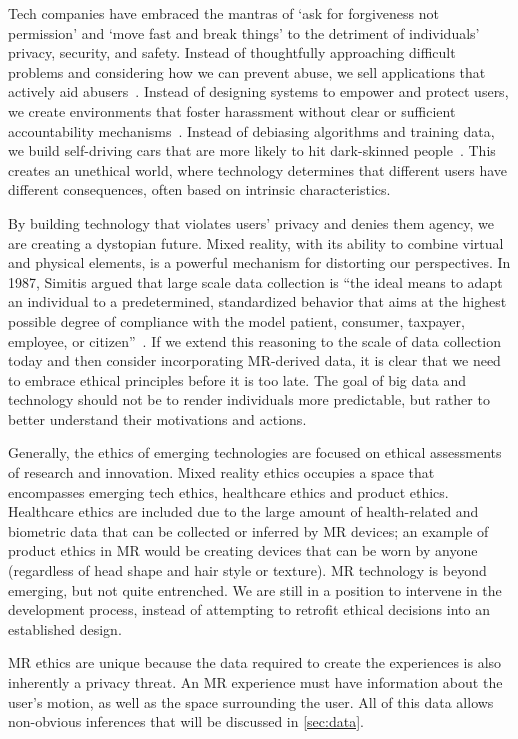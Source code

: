 Tech companies have embraced the mantras of `ask for forgiveness not permission' and `move fast and break things' to the detriment of individuals' privacy, security, and safety. Instead of thoughtfully approaching difficult problems and considering how we can prevent abuse, we sell applications that actively aid abusers~\cite{dell}. Instead of designing systems to empower and protect users, we create environments that foster harassment without clear or sufficient accountability mechanisms~\cite{dreyfuss}. Instead of debiasing algorithms and training data, we build self-driving cars that are more likely to hit dark-skinned people~\cite{wilson2019predictive}. This creates an unethical world, where technology determines that different users have different consequences, often based on intrinsic characteristics.

By building technology that violates users' privacy and denies them agency, we are creating a dystopian future. Mixed reality, with its ability to combine virtual and physical elements, is a powerful mechanism for distorting our perspectives.  In 1987, Simitis argued that large scale data collection is ``the ideal means to adapt an individual to a predetermined, standardized behavior that aims at the highest possible degree of compliance with the model patient, consumer, taxpayer, employee, or citizen''~\cite{simitis}. If we extend this reasoning to the scale of data collection today and then consider incorporating MR-derived data, it is clear that we need to embrace ethical principles before it is too late. The goal of big data and technology should not be to render individuals more predictable, but rather to better understand their motivations and actions.

Generally, the ethics of emerging technologies are focused on ethical assessments of research and innovation. Mixed reality ethics occupies a space that encompasses emerging tech ethics, healthcare ethics and product ethics. Healthcare ethics are included due to the large amount of health-related and biometric data that can be collected or inferred by MR devices; an example of product ethics in MR would be creating devices that can be worn by anyone (regardless of head shape and hair style or texture). MR technology is beyond emerging, but not quite entrenched. We are still in a position to intervene in the development process, instead of attempting to retrofit ethical decisions into an established design.

MR ethics are unique because the data required to create the experiences is also inherently a privacy threat. An MR experience must have information about the user's motion, as well as the space surrounding the user. All of this data allows non-obvious inferences that will be discussed in \autoref{sec:data}.


